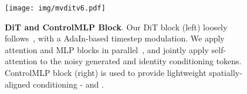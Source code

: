
\begin{figure}[t]
    \centering    
    \texttt{[image: img/mvditv6.pdf]}
    \vspace{-0.5cm}
    \caption{\textbf{DiT and ControlMLP Block}. Our DiT block (left) loosely follows~\cite{stable_diffusion}, 
    with a AdaIn-based timestep modulation. 
    We apply attention and MLP blocks in parallel~\cite{pmlr-v202-dehghani23a}, 
    and jointly apply self-attention to the noisy generated and identity conditioning tokens. 
    ControlMLP block (right) is used to provide lightweight spatially-aligned conditioning - 
    \plucker and \spatialanchor. }
    \label{fig:dit_block}
    \vspace{-0.2in}
\end{figure}

